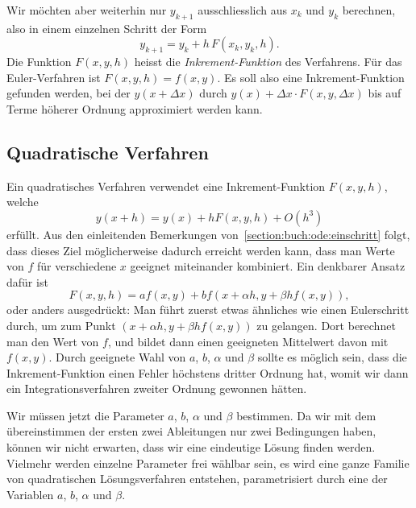 Wir möchten aber weiterhin nur $y_{k+1}$ ausschliesslich aus $x_k$ und $y_k$
berechnen, also in einem einzelnen Schritt der Form
\[
y_{k+1}=y_k + h\, F(x_k, y_k, h).
\]
Die Funktion $F(x,y,h)$ heisst die {\em Inkrement-Funktion}
%
des Verfahrens.
Für das Euler-Verfahren ist $F(x,y,h)=f(x,y)$.
Es soll also eine Inkrement-Funktion gefunden werden, bei der $y(x+\Delta x)$
durch $y(x) + \Delta x\cdot F(x,y,\Delta x)$ bis auf Terme höherer
Ordnung approximiert werden kann.

\subsection{Quadratische Verfahren}
Ein quadratisches Verfahren verwendet eine Inkrement-Funktion $F(x,y,h)$,
welche
\[
y(x+h)=y(x)+hF(x,y,h)+O(h^3)
\]
erfüllt.
Aus den einleitenden Bemerkungen von~\ref{section:buch:ode:einschritt}
folgt, dass dieses Ziel möglicherweise dadurch erreicht werden kann,
dass man Werte von $f$ für verschiedene $x$ geeignet miteinander
kombiniert.
Ein denkbarer Ansatz dafür ist
\[
F(x,y,h)=af(x,y) + bf(x+\alpha h, y +\beta hf(x,y)),
\]
oder anders ausgedrückt: Man führt zuerst etwas ähnliches wie einen
Eulerschritt durch, um zum Punkt $(x+\alpha h,y+\beta hf(x,y))$ zu
gelangen.
Dort berechnet man den Wert von $f$, und bildet dann einen geeigneten
Mittelwert davon  mit $f(x,y)$.
Durch geeignete Wahl von $a$, $b$, $\alpha$ und $\beta$ sollte es möglich
sein, dass die Inkrement-Funktion einen Fehler höchstens dritter Ordnung
hat, womit wir dann ein Integrationsverfahren zweiter Ordnung gewonnen
hätten.

Wir müssen jetzt die Parameter $a$, $b$, $\alpha$ und $\beta$ bestimmen.
Da wir mit dem übereinstimmen der ersten zwei Ableitungen
nur zwei Bedingungen haben, können wir nicht erwarten, dass wir
eine eindeutige Lösung finden werden.
Vielmehr werden einzelne Parameter frei wählbar sein, es wird eine
ganze Familie von quadratischen Lösungsverfahren entstehen, parametrisiert
durch eine der Variablen $a$, $b$, $\alpha$ und $\beta$.

